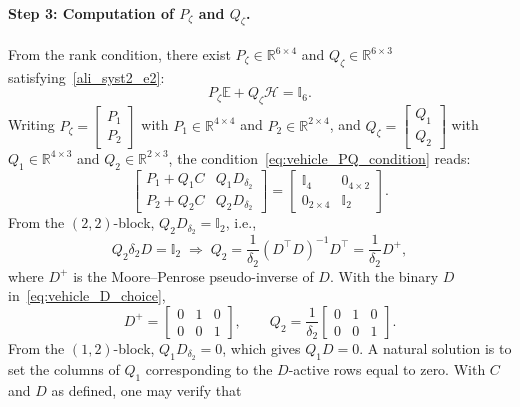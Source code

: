 \paragraph{Step 3: Computation of $P_\zeta$ and $Q_\zeta$.}
From the rank condition, there exist $P_\zeta\in\mathbb{R}^{6\times 4}$ and $Q_\zeta\in\mathbb{R}^{6\times 3}$ satisfying~\eqref{ali_syst2_e2}:
\begin{equation}\label{eq:vehicle_PQ_condition}
P_\zeta \mathbb{E} + Q_\zeta \mathcal{H} = \mathbb{I}_{6}.
\end{equation}
Writing $P_\zeta = \begin{bmatrix} P_1 \\ P_2 \end{bmatrix}$ with $P_1\in\mathbb{R}^{4\times 4}$ and $P_2\in\mathbb{R}^{2\times 4}$, and $Q_\zeta = \begin{bmatrix} Q_1 \\ Q_2 \end{bmatrix}$ with $Q_1\in\mathbb{R}^{4\times 3}$ and $Q_2\in\mathbb{R}^{2\times 3}$, the condition~\eqref{eq:vehicle_PQ_condition} reads:
\begin{equation}
\begin{bmatrix}
P_1 + Q_1 C & Q_1 D_{\delta_2} \\
P_2 + Q_2 C & Q_2 D_{\delta_2}
\end{bmatrix}
=
\begin{bmatrix}
\mathbb{I}_4 & 0_{4\times 2} \\
0_{2\times 4} & \mathbb{I}_2
\end{bmatrix}.
\end{equation}
From the $(2,2)$-block, $Q_2 D_{\delta_2} = \mathbb{I}_2$, i.e.,
\begin{equation}
Q_2 \delta_2 D = \mathbb{I}_2 \;\Longrightarrow\;
Q_2 = \frac{1}{\delta_2}(D^\top D)^{-1}D^\top = \frac{1}{\delta_2}D^{+},
\end{equation}
where $D^{+}$ is the Moore--Penrose pseudo-inverse of $D$. With the binary $D$ in~\eqref{eq:vehicle_D_choice},
\begin{equation}\label{eq:Q2_vehicle}
D^+ = \begin{bmatrix} 0 & 1 & 0 \\ 0 & 0 & 1 \end{bmatrix}, \qquad
Q_2 = \frac{1}{\delta_2}\begin{bmatrix} 0 & 1 & 0 \\ 0 & 0 & 1 \end{bmatrix}.
\end{equation}
From the $(1,2)$-block, $Q_1 D_{\delta_2}=0$, which gives $Q_1 D = 0$. A natural solution is to set the columns of $Q_1$ corresponding to the $D$-active rows equal to zero. With $C$ and $D$ as defined, one may verify that
